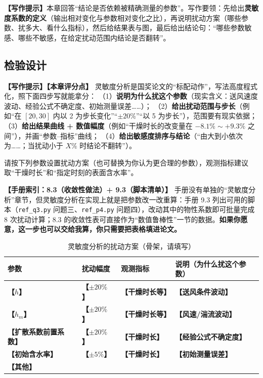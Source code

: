 \documentclass[12pt,a4paper]{article}
\newcommand{\prompt}[1]{\par\noindent\textbf{【写作提示】}#1\par}      %
\newcommand{\ph}[1]{\textbf{【#1】}}                                   %
\newcommand{\handbook}[2]{\par\noindent\textbf{【手册索引：#1】} #2\par}
\begin{document}
\prompt{本章回答“结论是否依赖被精确测量的参数”。写作要领：先给出\textbf{灵敏度系数的定义}（输出相对变化与参数相对变化之比），再说明扰动方案（哪些参数、扰多大、看什么指标），然后给结果表与图，最后给出结论句：“哪些参数敏感、哪些不敏感，在给定扰动范围内结论是否翻转”。}

\subsection{检验设计}

\prompt{\textbf{【本章评分点】} 灵敏度分析是国奖论文的“标配动作”，写法高度程式化，照下面四步写就能拿分：
（1）\textbf{说明为什么扰这个参数}（现实含义：送风速度波动、经验公式不确定度、初始测量误差……）；
（2）\textbf{给出扰动范围与步长}（例如“在 $[20,30]$ 内以 2 为步长变化”“$\pm20\%$”“以 5 为步长”），范围要有现实依据；
（3）\textbf{给出结果曲线 + 数值幅度}（例如“干燥时长的改变量在 $-8.1\%\sim+9.3\%$ 之间”），并画“参数–指标”曲线；
（4）\textbf{给出敏感度排序与结论}（“由大到小依次为……；当扰动小于 $X\%$ 时结论不翻转”）。

请按下列参数设置扰动方案（也可替换为你认为更合理的参数），观测指标建议取“干燥时长”和“指定时刻的表面含水率”。}

\handbook{8.3（收敛性做法）+ 9.3（脚本清单）}{手册没有单独的“灵敏度分析”章节，但灵敏度分析在实现上就是把参数改一改重算：手册 9.3 列出可用的脚本（\texttt{ref\_q3.py} 问题三、\texttt{ref\_p4.py} 问题四），改动其中的物性系数即可批量完成 8 次扰动计算；8.3 的收敛性表可直接作为“数值鲁棒性”一节的数据。\textbf{如果你愿意，这一步也可以交给我算，你只需要把表格填进论文。}}

\begin{table}[H]
\centering
\caption{灵敏度分析的扰动方案（骨架，请填写）}
\label{tab:sensitivity-plan}
\begin{tabular}{p{3.4cm}p{3.0cm}p{3.4cm}p{4.4cm}}
\toprule
参数 & 扰动幅度 & 观测指标 & 说明（为什么扰这个参数）\\
\midrule
\ph{$h$} & \ph{$\pm20\%$} & \ph{干燥时长等} & \ph{送风条件波动}\\
\ph{$h_m$} & \ph{$\pm20\%$} & \ph{干燥时长等} & \ph{风速/湍流波动}\\
\ph{扩散系数前置系数} & \ph{$\pm20\%$} & \ph{干燥时长} & \ph{经验公式不确定度}\\
\ph{初始含水率} & \ph{$\pm5\%$} & \ph{干燥时长} & \ph{初始测量误差}\\
\ph{其他} & & & \\
\bottomrule
\end{tabular}
\end{table}
\end{document}
